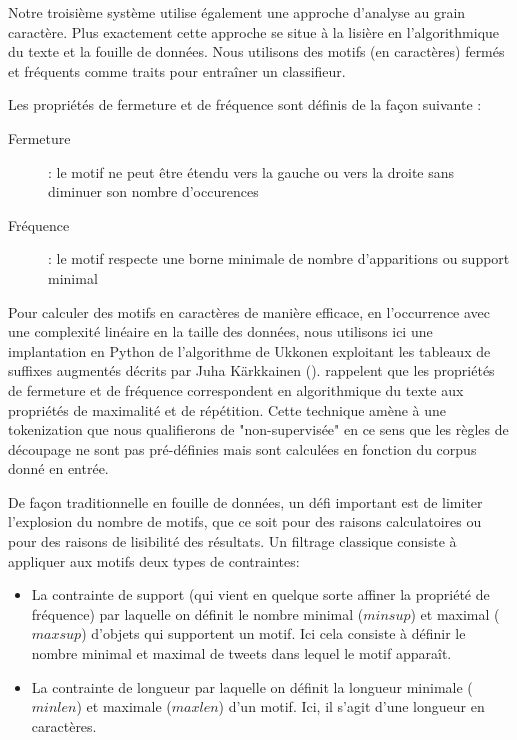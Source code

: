  Notre troisième système utilise également une approche d'analyse au grain caractère. Plus exactement cette approche se situe à la lisière en l'algorithmique du texte et la fouille de données.
 Nous utilisons des motifs (en caractères) fermés et fréquents comme traits pour entraîner un classifieur.

 Les propriétés de fermeture et de fréquence sont définis de la façon suivante :%
\begin{description}
\item[Fermeture]: le motif ne peut être étendu vers la gauche ou vers la droite sans diminuer son nombre d'occurences
\item[Fréquence]: le motif respecte une borne minimale de nombre d'apparitions ou support minimal
\end{description}

 Pour calculer des motifs en caractères de manière efficace, en l'occurrence avec une complexité linéaire en la taille des données, nous utilisons ici une implantation en Python de l'algorithme de Ukkonen \cite{Ukkonen-2006} exploitant les tableaux de suffixes augmentés décrits par Juha Kärkkainen (\cite{Karkka-2006}).
 \cite{Buscaldi-2017} rappelent que les propriétés de fermeture et de fréquence correspondent en algorithmique du texte aux propriétés de maximalité et de répétition.
 Cette technique amène à une tokenization que nous qualifierons de "non-supervisée" en ce sens que les règles de découpage ne sont pas pré-définies mais sont calculées en fonction du corpus donné en entrée.%
 
 De façon traditionnelle en fouille de données, un défi important est de limiter l'explosion du nombre de motifs, que ce soit pour des raisons calculatoires ou pour des raisons de lisibilité des résultats.%
 Un filtrage classique consiste à appliquer aux motifs deux types de contraintes:
\begin{itemize}
  \item La contrainte de support (qui vient en quelque sorte affiner la propriété de fréquence) par laquelle on définit le nombre minimal ($minsup$) et maximal ($maxsup$) d'objets qui supportent un motif. Ici cela consiste à définir le nombre minimal et maximal de tweets dans lequel le motif apparaît.
  \item La contrainte de longueur par laquelle on définit la longueur minimale ($minlen$) et maximale ($maxlen$) d'un motif. Ici, il s'agit d'une longueur en caractères.
\end{itemize}

